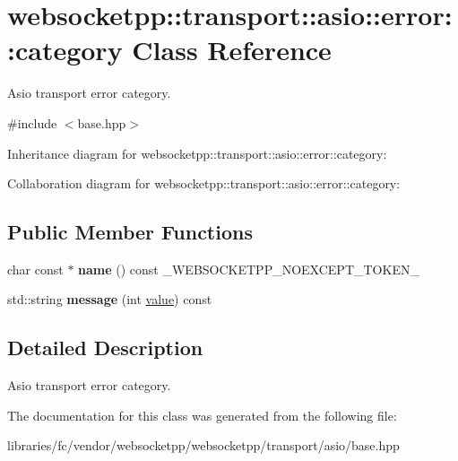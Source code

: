\hypertarget{classwebsocketpp_1_1transport_1_1asio_1_1error_1_1category}{}\section{websocketpp\+:\+:transport\+:\+:asio\+:\+:error\+:\+:category Class Reference}
\label{classwebsocketpp_1_1transport_1_1asio_1_1error_1_1category}


Asio transport error category.  




{\ttfamily \#include $<$base.\+hpp$>$}



Inheritance diagram for websocketpp\+:\+:transport\+:\+:asio\+:\+:error\+:\+:category\+:


Collaboration diagram for websocketpp\+:\+:transport\+:\+:asio\+:\+:error\+:\+:category\+:
\subsection*{Public Member Functions}
\begin{DoxyCompactItemize}
\item 
\mbox{\label{classwebsocketpp_1_1transport_1_1asio_1_1error_1_1category_af661dabfb4baefe6954d785b3b4fea57}} 
char const  $\ast$ {\bfseries name} () const \+\_\+\+W\+E\+B\+S\+O\+C\+K\+E\+T\+P\+P\+\_\+\+N\+O\+E\+X\+C\+E\+P\+T\+\_\+\+T\+O\+K\+E\+N\+\_\+
\item 
\mbox{\label{classwebsocketpp_1_1transport_1_1asio_1_1error_1_1category_aef49ea23d7e4161c0f4623fa5c2e5045}} 
std\+::string {\bfseries message} (int \mbox{\hyperlink{namespacewebsocketpp_1_1transport_1_1asio_1_1error_aeb44b27fc0ffac2a8991bf629cbfd045}{value}}) const
\end{DoxyCompactItemize}


\subsection{Detailed Description}
Asio transport error category. 

The documentation for this class was generated from the following file\+:\begin{DoxyCompactItemize}
\item 
libraries/fc/vendor/websocketpp/websocketpp/transport/asio/base.\+hpp\end{DoxyCompactItemize}
